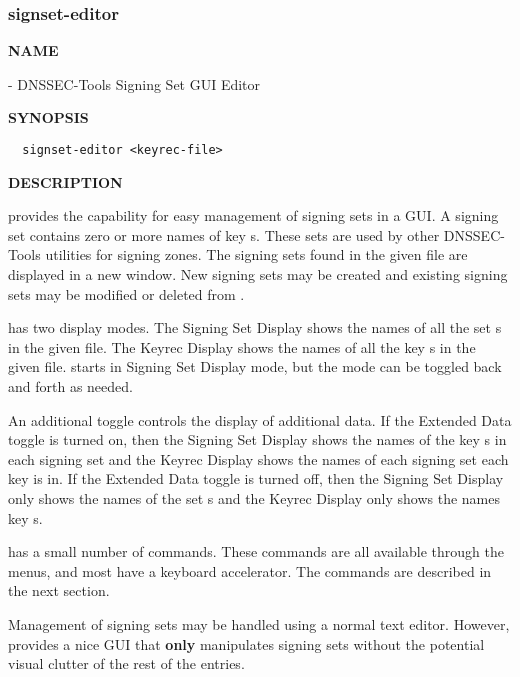 \clearpage

\subsubsection{signset-editor}

{\bf NAME}

 - DNSSEC-Tools Signing Set GUI Editor

{\bf SYNOPSIS}

\begin{verbatim}
  signset-editor <keyrec-file>
\end{verbatim}

{\bf DESCRIPTION}

 provides the capability for easy management of signing
sets in a GUI.  A signing set contains zero or more names of key
s.  These sets are used by other DNSSEC-Tools utilities for
signing zones.  The signing sets found in the given  file are
displayed in a new window.  New signing sets may be created and existing
signing sets may be modified or deleted from .

 has two display modes.  The Signing Set Display shows the
names of all the set s in the given  file.  The
Keyrec Display shows the names of all the key s in the given
 file.   starts in Signing Set Display
mode, but the mode can be toggled back and forth as needed.

An additional toggle controls the display of additional data.  If the Extended
Data toggle is turned on, then the Signing Set Display shows the names of the
key s in each signing set and the Keyrec Display shows the
names of each signing set each key  is in.  If the Extended
Data toggle is turned off, then the Signing Set Display only shows the names
of the set s and the Keyrec Display only shows the names key
s.

 has a small number of commands.  These commands are all
available through the menus, and most have a keyboard accelerator.  The
commands are described in the next section.

Management of signing sets may be handled using a normal text editor.
However,  provides a nice GUI that {\bf only} manipulates
signing sets without the potential visual clutter of the rest of the
 entries.

